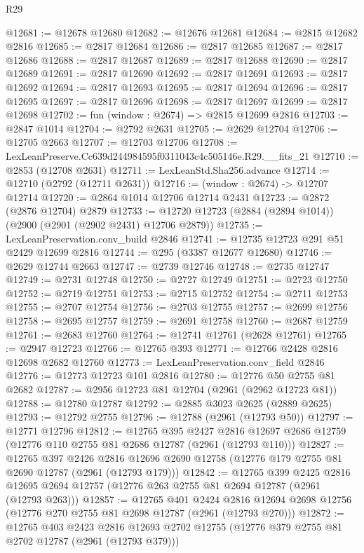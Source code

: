 \begin{lexlean}{R29}
\begin{coremodule}
@12681 := @12678 @12680
@12682 := @12676 @12681
@12684 := @2815 @12682 @2816
@12685 := @2817 @12684
@12686 := @2817 @12685
@12687 := @2817 @12686
@12688 := @2817 @12687
@12689 := @2817 @12688
@12690 := @2817 @12689
@12691 := @2817 @12690
@12692 := @2817 @12691
@12693 := @2817 @12692
@12694 := @2817 @12693
@12695 := @2817 @12694
@12696 := @2817 @12695
@12697 := @2817 @12696
@12698 := @2817 @12697
@12699 := @2817 @12698
@12702 := fun (window : @2674) => @2815 @12699 @2816
@12703 := @2847 @1014
@12704 := @2792 @2631
@12705 := @2629 @12704
@12706 := @12705 @2663
@12707 := @12703 @12706
@12708 := LexLeanPreserve.Cc639d244984595f0311043c4c505146e.R29.__fits_21
@12710 := @2853 (@12708 @2631)
@12711 := LexLeanStd.Sha256.advance
@12714 := @12710 (@2792 (@12711 @2631))
@12716 := (window : @2674) -> @12707 @12714
@12720 := @2864 @1014 @12706 @12714 @2431
@12723 := @2872 (@2876 @12704) @2879
@12733 := @12720 @12723 (@2884 (@2894 @1014)) (@2900 (@2901 (@2902 @2431) @12706 @2879))
@12735 := LexLeanPreservation.conv_build @2846
@12741 := @12735 @12723 @291 @51 @2429 @12699 @2816
@12744 := @295 (@3387 @12677 @12680)
@12746 := @2629 @12744 @2663
@12747 := @2739 @12746
@12748 := @2735 @12747
@12749 := @2731 @12748
@12750 := @2727 @12749
@12751 := @2723 @12750
@12752 := @2719 @12751
@12753 := @2715 @12752
@12754 := @2711 @12753
@12755 := @2707 @12754
@12756 := @2703 @12755
@12757 := @2699 @12756
@12758 := @2695 @12757
@12759 := @2691 @12758
@12760 := @2687 @12759
@12761 := @2683 @12760
@12764 := @12741 @12761 (@2628 @12761)
@12765 := @2947 @12723
@12766 := @12765 @393
@12771 := @12766 @2428 @2816 @12698 @2682 @12760
@12773 := LexLeanPreservation.conv_field @2846
@12776 := @12773 @12723 @101 @2816
@12780 := @12776 @50 @2755 @81 @2682
@12787 := @2956 @12723 @81 @12704 (@2961 (@2962 @12723 @81))
@12788 := @12780 @12787
@12792 := @2885 @3023 @2625 (@2889 @2625)
@12793 := @12792 @2755
@12796 := @12788 (@2961 (@12793 @50))
@12797 := @12771 @12796
@12812 := @12765
    @395
    @2427
    @2816
    @12697
    @2686
    @12759
    (@12776 @110 @2755 @81 @2686 @12787 (@2961 (@12793 @110)))
@12827 := @12765
    @397
    @2426
    @2816
    @12696
    @2690
    @12758
    (@12776 @179 @2755 @81 @2690 @12787 (@2961 (@12793 @179)))
@12842 := @12765
    @399
    @2425
    @2816
    @12695
    @2694
    @12757
    (@12776 @263 @2755 @81 @2694 @12787 (@2961 (@12793 @263)))
@12857 := @12765
    @401
    @2424
    @2816
    @12694
    @2698
    @12756
    (@12776 @270 @2755 @81 @2698 @12787 (@2961 (@12793 @270)))
@12872 := @12765
    @403
    @2423
    @2816
    @12693
    @2702
    @12755
    (@12776 @379 @2755 @81 @2702 @12787 (@2961 (@12793 @379)))

\end{coremodule}
\end{lexlean}
